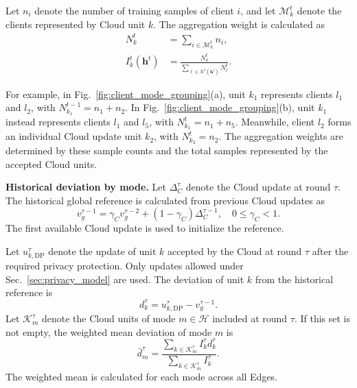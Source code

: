 \documentclass[5p,times]{elsarticle}
\theoremstyle{plain}
\theoremstyle{definition}
\theoremstyle{remark}
\begin{document}
	
	Let $n_i$ denote the number of training samples
	of client $i$, and let $\mathcal M_k^t$ denote
	the clients represented by Cloud unit $k$.
	The aggregation weight is calculated as
	\begin{equation}
		\begin{aligned}
			N_k^t
			&=\sum_{i\in\mathcal M_k^t}n_i,\\
			I_k^t(\mathbf h^t)
			&=\frac{N_k^t}
			{\sum_{\ell\in\mathcal K^t(\mathbf h^t)}N_\ell^t}.
		\end{aligned}
		\label{eq:cloud_unit_weights}
	\end{equation}
	
	For example, in Fig.~\ref{fig:client_mode_grouping}(a),
	unit $k_1$ represents clients $l_1$ and $l_2$,
	with $N_{k_1}^{t-1}=n_1+n_2$.
	In Fig.~\ref{fig:client_mode_grouping}(b),
	unit $k_1$ instead represents clients $l_1$
	and $l_5$, with $N_{k_1}^t=n_1+n_5$.
	Meanwhile, client $l_2$ forms an individual
	Cloud update unit $k_2$, with $N_{k_2}^t=n_2$.
	The aggregation weights are determined by
	these sample counts and the total samples
	represented by the accepted Cloud units.
	
	
	\textbf{Historical deviation by mode.}
	Let $\Delta_C^\tau$ denote the Cloud update at round $\tau$.
	The historical global reference is calculated from previous
	Cloud updates as
	\begin{equation}
		v_g^{\tau-1}
		=\gamma_C v_g^{\tau-2}
		+(1-\gamma_C)\Delta_C^{\tau-1},
		\quad 0\leq\gamma_C<1.
		\label{eq:global_ema}
	\end{equation}
	The first available Cloud update is used to initialize
	the reference.
	
	Let $u_{k,\mathrm{DP}}^\tau$ denote the update of unit $k$
	accepted by the Cloud at round $\tau$ after the required
	privacy protection. Only updates allowed under
	Sec.~\ref{sec:privacy_model} are used.
	The deviation of unit $k$ from the historical reference is
	\begin{equation}
		d_k^\tau=u_{k,\mathrm{DP}}^\tau-v_g^{\tau-1}.
		\label{eq:unit_deviation}
	\end{equation}
	Let $\mathcal K_m^\tau$ denote the Cloud units of mode
	$m\in\mathcal H$ included at round $\tau$.
	If this set is not empty, the weighted mean deviation of
	mode $m$ is
	\begin{equation}
		\bar d_m^\tau
		=\frac{\sum_{k\in\mathcal K_m^\tau}I_k^\tau d_k^\tau}
		{\sum_{k\in\mathcal K_m^\tau}I_k^\tau}.
		\label{eq:mode_mean_deviation}
	\end{equation}
	The weighted mean is calculated for each mode across all Edges.
	
\end{document}
